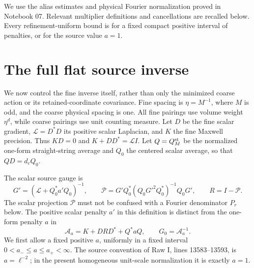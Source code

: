 \documentclass[11pt]{article}
\theoremstyle{remark}
\newcommand{\norm}[1]{\left\|#1\right\|}
\newcommand{\diag}{\operatorname{diag}}
\begin{document}
We use the alias estimates and physical Fourier normalization proved
in Notebook 07. Relevant multiplier definitions and cancellations are
recalled below. Every refinement-uniform bound is for a fixed compact
positive interval of penalties, or for the source value $a=1$.
\section{The full flat source inverse}
\label{inv-section}

We now control the fine inverse itself, rather than only the minimized
coarse action or its retained-coordinate covariance. Fine spacing is
$\eta=M^{-1}$, where $M$ is odd, and the coarse physical spacing is one.
All fine pairings use volume weight $\eta^d$, while coarse pairings use
unit counting measure. Let $D$ be the fine scalar gradient,
$\mathcal L=D^*D$ its positive scalar Laplacian, and $K$ the fine
Maxwell precision. Thus $KD=0$ and $K+DD^*=\mathcal L I$.
Let $Q=Q_M^{\rm st}$ be the normalized one-form straight-string average
and $Q_0$ the centered scalar average, so that $QD=d_cQ_0$.

The scalar source gauge is
\begin{equation}\label{inv-source-projection}
 G'=(\mathcal L+Q_0^*a'Q_0)^{-1},\qquad
 \mathcal P=G'Q_0^*(Q_0G'^2Q_0^*)^{-1}Q_0G',\qquad R=I-\mathcal P.
\end{equation}
The scalar projection $\mathcal P$ must not be confused with a Fourier
denominator $P_r$ below. The positive scalar penalty $a'$ in this
definition is distinct from the one-form penalty $a$ in
\begin{equation}\label{inv-fine-precision}
 \mathcal A_a=K+DRD^*+Q^*aQ,\qquad G_0=\mathcal A_a^{-1}.
\end{equation}
We first allow a fixed positive $a$, uniformly in a fixed interval
$0<a_-\le a\le a_+<\infty$. The source convention of Raw I,
lines 13583--13593, is $a=\ell^{-2}$; in the present homogeneous
unit-scale normalization it is exactly $a=1$.
\end{document}
